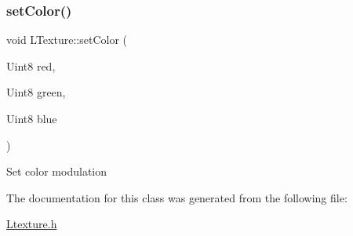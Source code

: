 \subsubsection{\texorpdfstring{set\+Color()}{setColor()}}
{\footnotesize\ttfamily void L\+Texture\+::set\+Color (\begin{DoxyParamCaption}\item[{Uint8}]{red,  }\item[{Uint8}]{green,  }\item[{Uint8}]{blue }\end{DoxyParamCaption})}

Set color modulation 

The documentation for this class was generated from the following file\+:\begin{DoxyCompactItemize}
\item 
\hyperlink{_ltexture_8h}{Ltexture.\+h}\end{DoxyCompactItemize}
